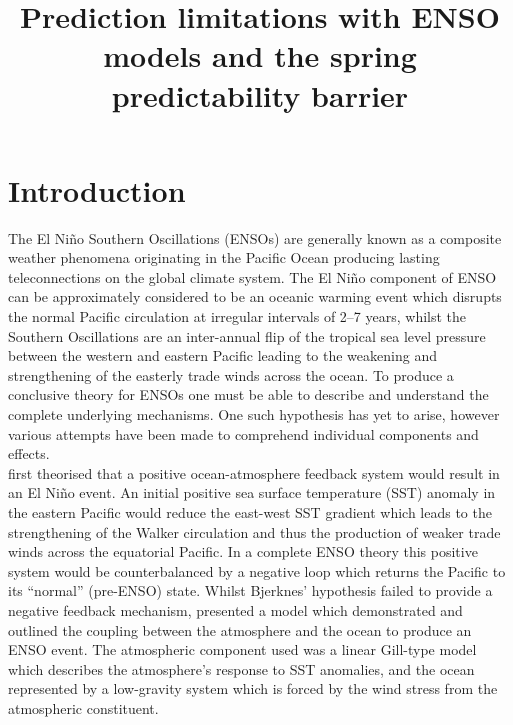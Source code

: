\documentclass[12pt, onecolumn]{revtex4}    %
\begin{document}
                     

\title{Prediction limitations with ENSO models and the spring predictability barrier} 

\maketitle
\thispagestyle{plain} %

\section{Introduction}
The El Ni\~{n}o Southern Oscillations (ENSOs) are generally known as a composite weather phenomena originating in the Pacific Ocean producing lasting teleconnections on the global climate system. The El Ni\~{n}o component of ENSO can be approximately considered to be an oceanic warming event which disrupts the normal Pacific circulation at irregular intervals of 2--7 years, whilst the Southern Oscillations are an inter-annual flip of the tropical sea level pressure between the western and eastern Pacific leading to the weakening and strengthening of the easterly trade winds across the ocean. To produce a conclusive theory for ENSOs one must be able to describe and understand the complete underlying mechanisms. One such hypothesis has yet to arise, however various attempts have been made to comprehend individual components and effects. \\

\cite{doi:10.1175/1520-04931969097} first theorised that a positive ocean-atmosphere feedback system would result in an El Ni\~{n}o event. An initial positive sea surface temperature (SST) anomaly in the eastern Pacific would reduce the east-west SST gradient which leads to the strengthening of the Walker circulation and thus the production of weaker trade winds across the equatorial Pacific. In a complete ENSO theory this positive system would be counterbalanced by a negative loop which returns the Pacific to its ``normal'' (pre-ENSO) state. Whilst Bjerknes' hypothesis failed to provide a negative feedback mechanism, \cite{Zebiak:1987aa} presented a model which demonstrated and outlined the coupling between the atmosphere and the ocean to produce an ENSO event. The atmospheric component used was a linear Gill-type model \citep{Gill:1980aa} which describes the atmosphere's response to SST anomalies, and the ocean represented by a low-gravity system which is forced by the wind stress from the atmospheric constituent. \\
\end{document}
